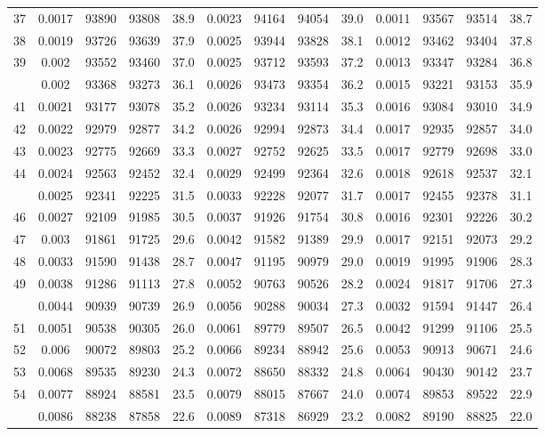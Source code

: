 \documentclass[
  14pt,
]{article}
\begin{document}
\begin{longtable}[t]{lcccccccccccc}
37 & 0.0017 & 93890 & 93808 & 38.9 & 0.0023 & 94164 & 94054 & 39.0 & 0.0011 & 93567 & 93514 & 38.7\\
38 & 0.0019 & 93726 & 93639 & 37.9 & 0.0025 & 93944 & 93828 & 38.1 & 0.0012 & 93462 & 93404 & 37.8\\
39 & 0.002 & 93552 & 93460 & 37.0 & 0.0025 & 93712 & 93593 & 37.2 & 0.0013 & 93347 & 93284 & 36.8\\
\addlinespace
40 & 0.002 & 93368 & 93273 & 36.1 & 0.0026 & 93473 & 93354 & 36.2 & 0.0015 & 93221 & 93153 & 35.9\\
41 & 0.0021 & 93177 & 93078 & 35.2 & 0.0026 & 93234 & 93114 & 35.3 & 0.0016 & 93084 & 93010 & 34.9\\
42 & 0.0022 & 92979 & 92877 & 34.2 & 0.0026 & 92994 & 92873 & 34.4 & 0.0017 & 92935 & 92857 & 34.0\\
43 & 0.0023 & 92775 & 92669 & 33.3 & 0.0027 & 92752 & 92625 & 33.5 & 0.0017 & 92779 & 92698 & 33.0\\
44 & 0.0024 & 92563 & 92452 & 32.4 & 0.0029 & 92499 & 92364 & 32.6 & 0.0018 & 92618 & 92537 & 32.1\\
\addlinespace
45 & 0.0025 & 92341 & 92225 & 31.5 & 0.0033 & 92228 & 92077 & 31.7 & 0.0017 & 92455 & 92378 & 31.1\\
46 & 0.0027 & 92109 & 91985 & 30.5 & 0.0037 & 91926 & 91754 & 30.8 & 0.0016 & 92301 & 92226 & 30.2\\
47 & 0.003 & 91861 & 91725 & 29.6 & 0.0042 & 91582 & 91389 & 29.9 & 0.0017 & 92151 & 92073 & 29.2\\
48 & 0.0033 & 91590 & 91438 & 28.7 & 0.0047 & 91195 & 90979 & 29.0 & 0.0019 & 91995 & 91906 & 28.3\\
49 & 0.0038 & 91286 & 91113 & 27.8 & 0.0052 & 90763 & 90526 & 28.2 & 0.0024 & 91817 & 91706 & 27.3\\
\addlinespace
50 & 0.0044 & 90939 & 90739 & 26.9 & 0.0056 & 90288 & 90034 & 27.3 & 0.0032 & 91594 & 91447 & 26.4\\
51 & 0.0051 & 90538 & 90305 & 26.0 & 0.0061 & 89779 & 89507 & 26.5 & 0.0042 & 91299 & 91106 & 25.5\\
52 & 0.006 & 90072 & 89803 & 25.2 & 0.0066 & 89234 & 88942 & 25.6 & 0.0053 & 90913 & 90671 & 24.6\\
53 & 0.0068 & 89535 & 89230 & 24.3 & 0.0072 & 88650 & 88332 & 24.8 & 0.0064 & 90430 & 90142 & 23.7\\
54 & 0.0077 & 88924 & 88581 & 23.5 & 0.0079 & 88015 & 87667 & 24.0 & 0.0074 & 89853 & 89522 & 22.9\\
\addlinespace
55 & 0.0086 & 88238 & 87858 & 22.6 & 0.0089 & 87318 & 86929 & 23.2 & 0.0082 & 89190 & 88825 & 22.0\\

\end{longtable}
\end{document}

